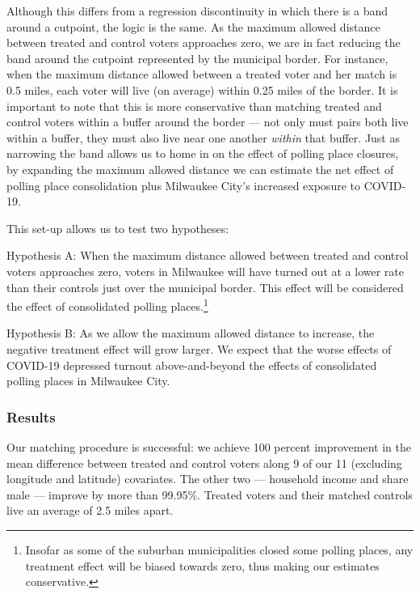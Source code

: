\documentclass[
  12pt,
]{article}
\begin{document}
Although this differs from a regression discontinuity in which there is a band around a cutpoint, the logic is the same. As the maximum allowed distance between treated and control voters approaches zero, we are in fact reducing the band around the cutpoint represented by the municipal border. For instance, when the maximum distance allowed between a treated voter and her match is 0.5 miles, each voter will live (on average) within 0.25 miles of the border. It is important to note that this is more conservative than matching treated and control voters within a buffer around the border --- not only must pairs both live within a buffer, they must also live near one another \emph{within} that buffer. Just as narrowing the band allows us to home in on the effect of polling place closures, by expanding the maximum allowed distance we can estimate the net effect of polling place consolidation plus Milwaukee City's increased exposure to COVID-19.

This set-up allows us to test two hypotheses:

Hypothesis A: When the maximum distance allowed between treated and control voters approaches zero, voters in Milwaukee will have turned out at a lower rate than their controls just over the municipal border. This effect will be considered the effect of consolidated polling places.\footnote{Insofar as some of the suburban municipalities closed some polling places, any treatment effect will be biased towards zero, thus making our estimates conservative.}

Hypothesis B: As we allow the maximum allowed distance to increase, the negative treatment effect will grow larger. We expect that the worse effects of COVID-19 depressed turnout above-and-beyond the effects of consolidated polling places in Milwaukee City.

\hypertarget{results}{%
\subsubsection*{Results}\label{results}}

Our matching procedure is successful: we achieve 100 percent improvement in the mean difference between treated and control voters along 9 of our 11 (excluding longitude and latitude) covariates. The other two --- household income and share male --- improve by more than 99.95\%. Treated voters and their matched controls live an average of 2.5 miles apart.
\end{document}
